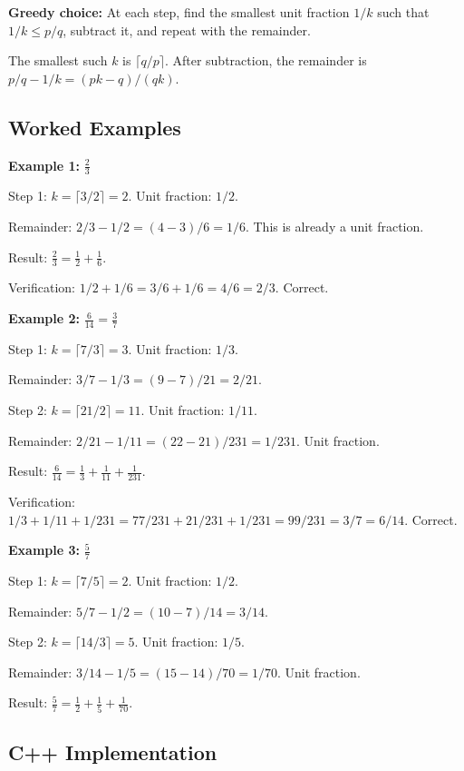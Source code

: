 \textbf{Greedy choice:} At each step, find the smallest unit fraction $1/k$ such that $1/k \leq p/q$, subtract it, and repeat with the remainder.

The smallest such $k$ is $\lceil q/p \rceil$. After subtraction, the remainder is $p/q - 1/k = (pk - q)/(qk)$.

\subsection{Worked Examples}

\textbf{Example 1:} $\frac{2}{3}$

Step 1: $k = \lceil 3/2 \rceil = 2$. Unit fraction: $1/2$.

Remainder: $2/3 - 1/2 = (4-3)/6 = 1/6$. This is already a unit fraction.

Result: $\frac{2}{3} = \frac{1}{2} + \frac{1}{6}$.

Verification: $1/2 + 1/6 = 3/6 + 1/6 = 4/6 = 2/3$. Correct.

\textbf{Example 2:} $\frac{6}{14} = \frac{3}{7}$

Step 1: $k = \lceil 7/3 \rceil = 3$. Unit fraction: $1/3$.

Remainder: $3/7 - 1/3 = (9-7)/21 = 2/21$.

Step 2: $k = \lceil 21/2 \rceil = 11$. Unit fraction: $1/11$.

Remainder: $2/21 - 1/11 = (22-21)/231 = 1/231$. Unit fraction.

Result: $\frac{6}{14} = \frac{1}{3} + \frac{1}{11} + \frac{1}{231}$.

Verification: $1/3 + 1/11 + 1/231 = 77/231 + 21/231 + 1/231 = 99/231 = 3/7 = 6/14$. Correct.

\textbf{Example 3:} $\frac{5}{7}$

Step 1: $k = \lceil 7/5 \rceil = 2$. Unit fraction: $1/2$.

Remainder: $5/7 - 1/2 = (10-7)/14 = 3/14$.

Step 2: $k = \lceil 14/3 \rceil = 5$. Unit fraction: $1/5$.

Remainder: $3/14 - 1/5 = (15-14)/70 = 1/70$. Unit fraction.

Result: $\frac{5}{7} = \frac{1}{2} + \frac{1}{5} + \frac{1}{70}$.

\subsection{C++ Implementation}

